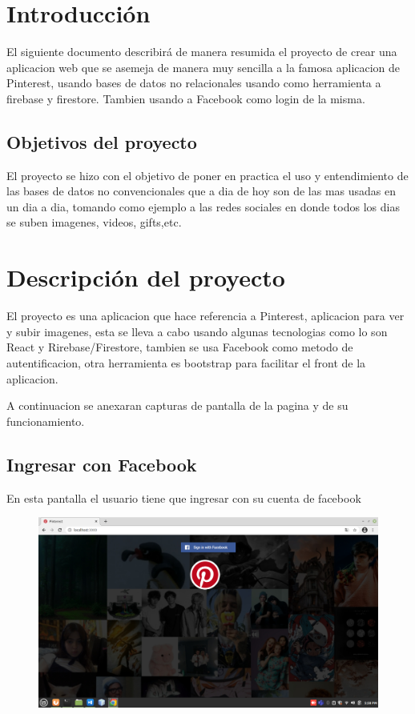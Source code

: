 \documentclass[60pt]{article}
\begin{document}
\newpage

\section{Introducción}

El siguiente documento describirá de manera resumida el proyecto de crear una aplicacion web que se asemeja de manera muy sencilla a la famosa aplicacion de Pinterest, usando bases de datos no relacionales usando como herramienta a firebase y firestore. Tambien usando a Facebook como login de la misma.

\subsection{Objetivos del proyecto}
El proyecto se hizo con el objetivo de poner en practica el uso y entendimiento de las bases de datos no convencionales que a dia de hoy son de las mas usadas en un dia a dia, tomando como ejemplo a las redes sociales en donde todos los dias se suben imagenes, videos, gifts,etc. 

\section{Descripción del proyecto}
El proyecto es una aplicacion que hace referencia a Pinterest, aplicacion para ver y subir imagenes, esta se lleva a cabo usando algunas tecnologias como lo son React y Rirebase/Firestore, tambien se usa Facebook como metodo de autentificacion, otra herramienta es bootstrap para facilitar el front de la aplicacion.

A continuacion se anexaran capturas de pantalla de la pagina y de su funcionamiento.

\subsection{Ingresar con Facebook}

En esta pantalla el usuario tiene que ingresar con su cuenta de facebook

\begin{figure}[htb]
\centering
\includegraphics[width=1\linewidth]{facebook.png}
\end{figure}
\end{document}
